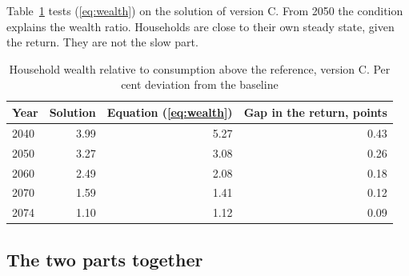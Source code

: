 \documentclass[11pt,a4paper]{article}
\begin{document}
Table~\ref{tab:households} tests (\ref{eq:wealth}) on the solution of version C. From 2050 the condition explains the wealth ratio.
Households are close to their own steady state, given the return. They are not the slow part.

\begin{table}[ht]
\centering
\small
\caption{Household wealth relative to consumption above the reference, version C. Per cent deviation from the baseline}
\label{tab:households}
\begin{tabular}{@{}lrrr@{}}
\toprule
Year & Solution & Equation (\ref{eq:wealth}) & Gap in the return, points \\
\midrule
2040 & 3.99 & 5.27 & 0.43 \\
2050 & 3.27 & 3.08 & 0.26 \\
2060 & 2.49 & 2.08 & 0.18 \\
2070 & 1.59 & 1.41 & 0.12 \\
2074 & 1.10 & 1.12 & 0.09 \\
\bottomrule
\end{tabular}
\end{table}

\subsection{The two parts together}
\label{sec:together}
\end{document}
